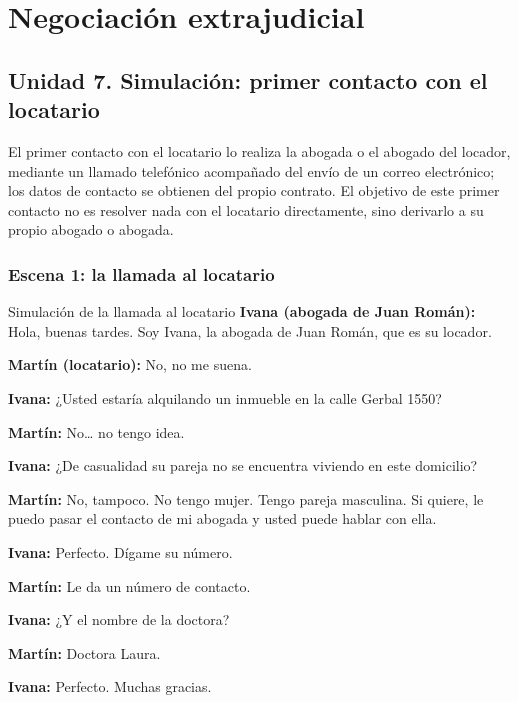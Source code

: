 \documentclass[12pt,oneside]{book}
\begin{document}
\clearpage

\chapter{Negociación extrajudicial}

\section*{Unidad 7. Simulación: primer contacto con el locatario}

El primer contacto con el locatario lo realiza la abogada o el abogado del locador, mediante un llamado telefónico acompañado del envío de un correo electrónico; los datos de contacto se obtienen del propio contrato. El objetivo de este primer contacto no es resolver nada con el locatario directamente, sino derivarlo a su propio abogado o abogada.

\subsection*{Escena 1: la llamada al locatario}

\begin{example}{Simulación de la llamada al locatario}
\textbf{Ivana (abogada de Juan Román):} Hola, buenas tardes. Soy Ivana, la abogada de Juan Román, que es su locador.

\textbf{Martín (locatario):} No, no me suena.

\textbf{Ivana:} ¿Usted estaría alquilando un inmueble en la calle Gerbal 1550?

\textbf{Martín:} No… no tengo idea.

\textbf{Ivana:} ¿De casualidad su pareja no se encuentra viviendo en este domicilio?

\textbf{Martín:} No, tampoco. No tengo mujer. Tengo pareja masculina. Si quiere, le puedo pasar el contacto de mi abogada y usted puede hablar con ella.

\textbf{Ivana:} Perfecto. Dígame su número.

\textbf{Martín:} Le da un número de contacto.

\textbf{Ivana:} ¿Y el nombre de la doctora?

\textbf{Martín:} Doctora Laura.

\textbf{Ivana:} Perfecto. Muchas gracias.
\end{example}
\end{document}
